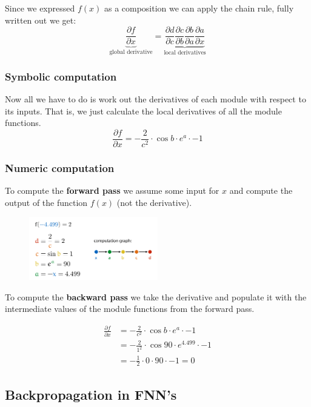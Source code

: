 \documentclass[12pt]{article}
\begin{document}
Since we expressed $f(x)$ as a composition we can apply the chain rule, fully written out we get:
\[
    \underbrace{\frac{\partial f}{\partial x}}_{\text{global derivative}} = \underbrace{\frac{\partial d}{\partial c}\frac{\partial c}{\partial b}\frac{\partial b}{\partial a}\frac{\partial a}{\partial x}}_\text{local derivatives}
\]

\subsubsection*{Symbolic computation}

Now all we have to do is work out the derivatives of each module with respect to its inputs. That is, we just calculate the local derivatives of all the module functions.
\[
    \frac{\partial f}{\partial x} = -\frac{2}{c^2}\cdot \cos b \cdot e^a \cdot -1  
\]

\subsubsection*{Numeric computation}

To compute the \textbf{forward pass} we assume some input for $x$ and compute the output of the function $f(x)$ (not the derivative).

\begin{figure}[!h]
    \centering
    \includegraphics[width=0.5\textwidth]{assets/forwardpass.png}
\end{figure}

To compute the \textbf{backward pass} we take the derivative and populate it with the intermediate values of the module functions from the forward pass. 

\begin{align*}
    \frac{\partial f}{\partial x} & = -\frac{2}{c^2}\cdot \cos b \cdot e^a \cdot -1 \\
    & = -\frac{2}{1^2}\cdot \cos 90 \cdot e^{4.499} \cdot -1 \\
    & = -\frac{1}{2}\cdot 0 \cdot 90 \cdot -1 = 0
\end{align*}

\subsection{Backpropagation in FNN's}
\end{document}

